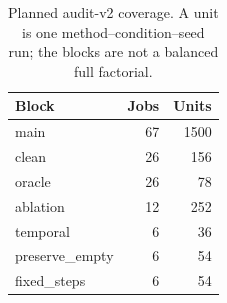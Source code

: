 \begin{table}[!t]
\centering\footnotesize
\caption{Planned audit-v2 coverage. A unit is one method--condition--seed run; the blocks are not a balanced full factorial.}\label{tab:coverage}
\begin{tabular}{lrr}
\toprule
Block & Jobs & Units \\
\midrule
main & 67 & 1500 \\
clean & 26 & 156 \\
oracle & 26 & 78 \\
ablation & 12 & 252 \\
temporal & 6 & 36 \\
preserve\_empty & 6 & 54 \\
fixed\_steps & 6 & 54 \\
\bottomrule
\end{tabular}
\end{table}
